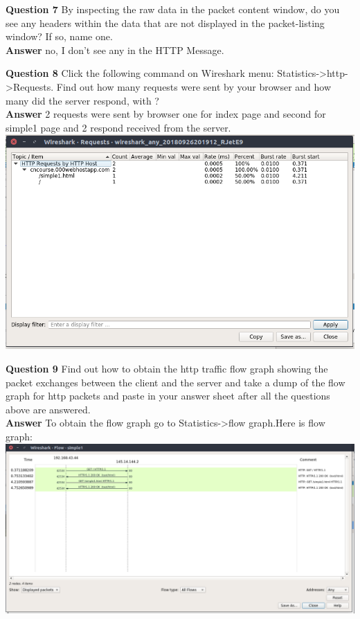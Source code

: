 \documentclass[14pt]{extarticle}
\begin{document}
    \noindent
    \textbf{\large Question 7}
    By inspecting the raw data in the packet content window,
    do you see any headers within the data that are not displayed 
    in the packet-listing window?  If so, name one.\\
    \textbf{\large Answer}
    no, I don't see any in the HTTP Message.\\
    \vspace{1cm}


    \noindent
    \textbf{\large Question 8}
    Click the following command on Wireshark menu:  Statistics->http->Requests. 
    Find out how many requests were sent by your browser and how many did the server respond, with ?\\
    \textbf{\large Answer}
    2 requests were sent by browser one for index page and second for simple1 page and 2 respond received from the server.\\[10pt]
    \includegraphics[scale=0.55]{1_4}\\
    \vspace{1cm}
    
    \noindent
    \textbf{\large Question 9}
    Find out how to obtain the http traffic flow graph 
    showing the packet exchanges between the client and the server 
    and take a dump of the flow graph for http packets 
    and paste in your answer sheet after all the questions above are answered.\\
    \textbf{\large Answer}
    To obtain the flow graph go to Statistics->flow graph.Here is flow graph:\\
    \includegraphics[scale=0.35]{1_5}
    \vspace{1cm}
\end{document}
